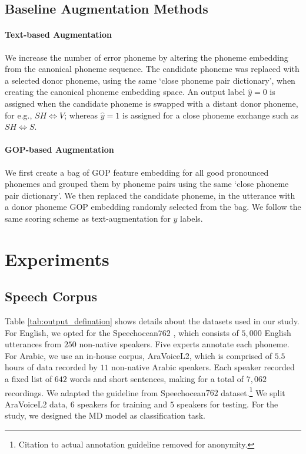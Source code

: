 \documentclass{INTERSPEECH2023}
\begin{document}
\subsection{Baseline Augmentation Methods}
\paragraph*{Text-based Augmentation}
We increase the number of error phoneme by altering the phoneme embedding from the canonical phoneme sequence. The candidate phoneme was replaced with a selected donor phoneme, using the same `close phoneme pair dictionary', when creating the canonical phoneme embedding space. An output label $\hat{y}=0$ is assigned when the candidate phoneme is swapped with a distant donor phoneme, for e.g., $SH \Leftrightarrow V$; whereas $\hat{y}=1$ is assigned for a close phoneme exchange such as $SH \Leftrightarrow S$.

\paragraph*{GOP-based Augmentation}
We first create a bag of GOP feature embedding for all good pronounced phonemes and grouped them by phoneme pairs using the same `close phoneme pair dictionary'. We then replaced the candidate phoneme, in the utterance with a donor phoneme GOP embedding randomly selected from the bag. We follow the same scoring scheme as text-augmentation for $\hat{y}$ labels.




\section{Experiments} 
\label{sec:exp}




\subsection{Speech Corpus}
Table \ref{tab:output_defination} shows details about the datasets used in our study. For English, we opted for the Speechocean$762$ \cite{speechocean}, which consists of $5,000$ English utterances from $250$ non-native speakers. Five experts annotate each phoneme. For Arabic, we use an in-house corpus, AraVoiceL2, which is comprised of $5.5$ hours of data recorded by $11$ non-native Arabic speakers. Each speaker recorded a fixed list of $642$ words and short sentences, making for a total of $7,062$ recordings. We adapted the guideline from Speechocean$762$ dataset.\footnote{Citation to actual annotation guideline removed for anonymity.} We split AraVoiceL2 data, $6$ speakers for training and $5$ speakers for testing. For the study, we designed the MD model as classification task.
\end{document}
